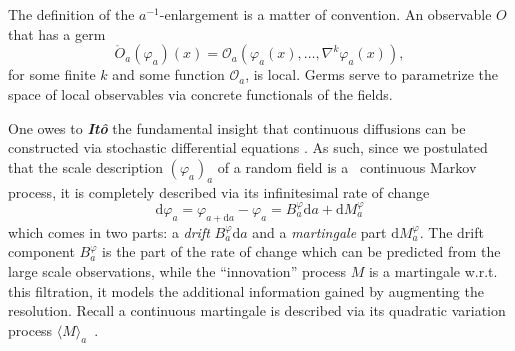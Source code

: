 \documentclass[reprint,aps]{revtex4-2}
\newcommand{\mathd}{\mathrm{d}}
\newcommand{\tmtextbf}[1]{\textbf{{{#1}}}}
\newcommand{\tmtextit}[1]{\textit{{{#1}}}}
\begin{document}
The definition of the $a^{- 1}$-enlargement is a matter of convention. An
observable $O$ that has a germ
\[ \ring{O}_a (\varphi_a) (x) =\mathcal{O}_a (\varphi_a (x), \ldots, \nabla^k
   \varphi_a (x)), \]
for some finite $k$ and some function $\mathcal{O}_a$, is local. Germs serve
to parametrize the space of local observables via concrete functionals of the
fields.

One owes to \tmtextbf{\tmtextit{It{\^o}}} the fundamental insight that
continuous diffusions can be constructed via stochastic differential equations
{\cite{stroockMarkovProcessesIto2003}}. As such, since we postulated that the
scale description $(\varphi_a)_a$ of a random field is a \ continuous Markov
process, it is completely described via its infinitesimal rate of change
\[ \mathd \varphi_a = \varphi_{a + \mathd a} - \varphi_a = B^{\varphi}_a
   \mathd a + \mathd M^{\varphi}_a \]
which comes in two parts: a \tmtextit{drift} $B^{\varphi}_a \mathd a$ and a
\tmtextit{martingale} part $\mathd M^{\varphi}_a$. The drift component
$B^{\varphi}_a$ is the part of the rate of change which can be predicted from
the large scale observations, while the ``innovation'' process $M$ is a
martingale w.r.t. this filtration, it models the additional information gained
by augmenting the resolution. Recall a continuous martingale is described via
its quadratic variation process $\langle M
\rangle_a$~{\cite{Rogers_Williams_2000}}.
\end{document}
